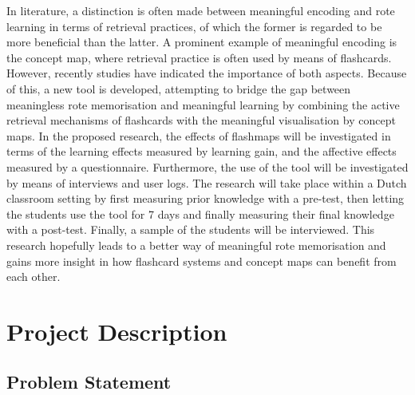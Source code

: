 \documentclass[11pt,twoside]{report} %
\begin{document}
In literature, a distinction is often made between meaningful encoding and rote learning in terms of retrieval practices, of which the former is regarded to be more beneficial than the latter. A prominent example of meaningful encoding is the concept map, where retrieval practice is often used by means of flashcards. However, recently studies have indicated the importance of both aspects. Because of this, a new tool is developed, attempting to bridge the gap between meaningless rote memorisation and meaningful learning by combining the active retrieval mechanisms of flashcards with the meaningful visualisation by concept maps. In the proposed research, the effects of flashmaps will be investigated in terms of the learning effects measured by learning gain, and the affective effects measured by a questionnaire. Furthermore, the use of the tool will be investigated by means of interviews and user logs. The research will take place within a Dutch classroom setting by first measuring prior knowledge with a pre-test, then letting the students use the tool for 7 days and finally measuring their final knowledge with a post-test. Finally, a sample of the students will be interviewed. This research hopefully leads to a better way of meaningful rote memorisation and gains more insight in how flashcard systems and concept maps can benefit from each other.

\chapter{Project Description}

\section{Problem Statement}



\end{document}
